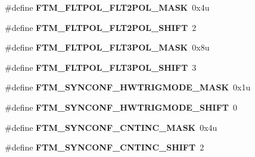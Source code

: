 \begin{DoxyCompactItemize}
\item 
\#define {\bfseries F\+T\+M\+\_\+\+F\+L\+T\+P\+O\+L\+\_\+\+F\+L\+T2\+P\+O\+L\+\_\+\+M\+A\+SK}~0x4u\hypertarget{group__FTM__Register__Masks_ga0810edda6aa6e4a53808b33db2049072}{}\label{group__FTM__Register__Masks_ga0810edda6aa6e4a53808b33db2049072}

\item 
\#define {\bfseries F\+T\+M\+\_\+\+F\+L\+T\+P\+O\+L\+\_\+\+F\+L\+T2\+P\+O\+L\+\_\+\+S\+H\+I\+FT}~2\hypertarget{group__FTM__Register__Masks_gadf4358730058b9bf99f5e8cfde4bd482}{}\label{group__FTM__Register__Masks_gadf4358730058b9bf99f5e8cfde4bd482}

\item 
\#define {\bfseries F\+T\+M\+\_\+\+F\+L\+T\+P\+O\+L\+\_\+\+F\+L\+T3\+P\+O\+L\+\_\+\+M\+A\+SK}~0x8u\hypertarget{group__FTM__Register__Masks_ga56880809c7351258a92bf4f55b1b43d0}{}\label{group__FTM__Register__Masks_ga56880809c7351258a92bf4f55b1b43d0}

\item 
\#define {\bfseries F\+T\+M\+\_\+\+F\+L\+T\+P\+O\+L\+\_\+\+F\+L\+T3\+P\+O\+L\+\_\+\+S\+H\+I\+FT}~3\hypertarget{group__FTM__Register__Masks_gaf5b8746ad3ae33f546df51f36e833b44}{}\label{group__FTM__Register__Masks_gaf5b8746ad3ae33f546df51f36e833b44}

\item 
\#define {\bfseries F\+T\+M\+\_\+\+S\+Y\+N\+C\+O\+N\+F\+\_\+\+H\+W\+T\+R\+I\+G\+M\+O\+D\+E\+\_\+\+M\+A\+SK}~0x1u\hypertarget{group__FTM__Register__Masks_ga60729d222bbb0fe4e36011bd682f4f82}{}\label{group__FTM__Register__Masks_ga60729d222bbb0fe4e36011bd682f4f82}

\item 
\#define {\bfseries F\+T\+M\+\_\+\+S\+Y\+N\+C\+O\+N\+F\+\_\+\+H\+W\+T\+R\+I\+G\+M\+O\+D\+E\+\_\+\+S\+H\+I\+FT}~0\hypertarget{group__FTM__Register__Masks_gaf56e2a17c8f817aa682fb4ad72873d74}{}\label{group__FTM__Register__Masks_gaf56e2a17c8f817aa682fb4ad72873d74}

\item 
\#define {\bfseries F\+T\+M\+\_\+\+S\+Y\+N\+C\+O\+N\+F\+\_\+\+C\+N\+T\+I\+N\+C\+\_\+\+M\+A\+SK}~0x4u\hypertarget{group__FTM__Register__Masks_gafeaceffaaecca1ef7e96a19e21e974fb}{}\label{group__FTM__Register__Masks_gafeaceffaaecca1ef7e96a19e21e974fb}

\item 
\#define {\bfseries F\+T\+M\+\_\+\+S\+Y\+N\+C\+O\+N\+F\+\_\+\+C\+N\+T\+I\+N\+C\+\_\+\+S\+H\+I\+FT}~2\hypertarget{group__FTM__Register__Masks_ga44117438734ea92c0ec67dc7be294074}{}\label{group__FTM__Register__Masks_ga44117438734ea92c0ec67dc7be294074}


\end{DoxyCompactItemize}
